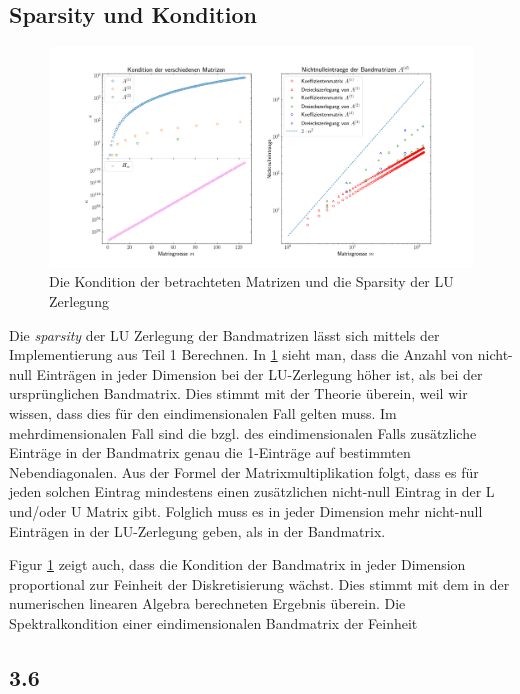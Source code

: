 \documentclass[smallheadings]{scrartcl}
\numberwithin{equation}{section}
\begin{document}
\subsection{Sparsity und Kondition}

\begin{figure}
	\centering
	\includegraphics[width=\linewidth]{Bericht/Bilder/sparsekon}
	\caption{Die Kondition der betrachteten Matrizen und die Sparsity der LU Zerlegung}
	\label{fig:sparsekon}
\end{figure}

Die \textit{sparsity} der LU Zerlegung der Bandmatrizen lässt sich mittels der Implementierung aus Teil 1 Berechnen. In \ref{fig:sparsekon} sieht man, dass die Anzahl von nicht-null Einträgen in jeder Dimension bei der LU-Zerlegung höher ist, als bei der ursprünglichen Bandmatrix. Dies stimmt mit der Theorie überein, weil wir wissen, dass dies für den eindimensionalen Fall gelten muss. Im mehrdimensionalen Fall sind die bzgl. des eindimensionalen Falls zusätzliche Einträge in der Bandmatrix genau die 1-Einträge auf bestimmten Nebendiagonalen. Aus der Formel der Matrixmultiplikation folgt, dass es für jeden solchen Eintrag mindestens einen zusätzlichen nicht-null Eintrag in der L und/oder U Matrix gibt. Folglich muss es in jeder Dimension mehr nicht-null Einträgen in der LU-Zerlegung geben, als in der Bandmatrix.

Figur \ref{fig:sparsekon} zeigt auch, dass die Kondition der Bandmatrix in jeder Dimension proportional zur Feinheit der Diskretisierung wächst. Dies stimmt mit dem in der numerischen linearen Algebra berechneten Ergebnis überein. Die Spektralkondition einer eindimensionalen Bandmatrix der Feinheit 


\subsection{3.6}
\end{document}
